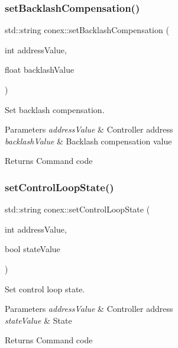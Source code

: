 \subsubsection{\texorpdfstring{set\+Backlash\+Compensation()}{setBacklashCompensation()}}
{\footnotesize\ttfamily std\+::string conex\+::set\+Backlash\+Compensation (\begin{DoxyParamCaption}\item[{int}]{address\+Value,  }\item[{float}]{backlash\+Value }\end{DoxyParamCaption})}



Set backlash compensation. 


\begin{DoxyParams}{Parameters}
{\em address\+Value} & Controller address \\
\hline
{\em backlash\+Value} & Backlash compensation value \\
\hline
\end{DoxyParams}
\begin{DoxyReturn}{Returns}
Command code 
\end{DoxyReturn}
\mbox{\label{namespaceconex_a617d632120418b5c8f501221c4b3c4e7}} 
\subsubsection{\texorpdfstring{set\+Control\+Loop\+State()}{setControlLoopState()}}
{\footnotesize\ttfamily std\+::string conex\+::set\+Control\+Loop\+State (\begin{DoxyParamCaption}\item[{int}]{address\+Value,  }\item[{bool}]{state\+Value }\end{DoxyParamCaption})}



Set control loop state. 


\begin{DoxyParams}{Parameters}
{\em address\+Value} & Controller address \\
\hline
{\em state\+Value} & State \\
\hline
\end{DoxyParams}
\begin{DoxyReturn}{Returns}
Command code 
\end{DoxyReturn}
\mbox{\label{namespaceconex_aa25149260c978531ca8f139da8b968b8}} 
